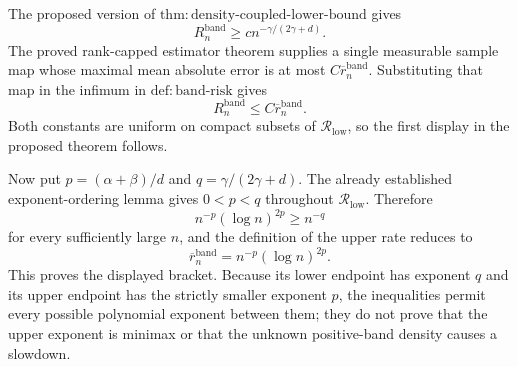 The proposed version of
\(\mathrm{thm:density\mbox{-}coupled\mbox{-}lower\mbox{-}bound}\) gives
\[
R_n^{\mathrm{band}}\geq c n^{-\gamma/(2\gamma+d)}.
\]
The proved rank-capped estimator theorem supplies a single measurable sample
map whose maximal mean absolute error is at most
\(C\overline r_n^{\mathrm{band}}\).  Substituting that map in the infimum in
\(\mathrm{def:band\mbox{-}risk}\) gives
\[
R_n^{\mathrm{band}}\leq C\overline r_n^{\mathrm{band}}.
\]
Both constants are uniform on compact subsets of
\(\mathcal R_{\mathrm{low}}\), so the first display in the proposed theorem
follows.

Now put \(p=(\alpha+\beta)/d\) and
\(q=\gamma/(2\gamma+d)\).  The already established exponent-ordering lemma
gives \(0<p<q\) throughout \(\mathcal R_{\mathrm{low}}\).  Therefore
\[
n^{-p}(\log n)^{2p}\geq n^{-q}
\]
for every sufficiently large \(n\), and the definition of the upper rate
reduces to
\[
\overline r_n^{\mathrm{band}}
=n^{-p}(\log n)^{2p}.
\]
This proves the displayed bracket.  Because its lower endpoint has exponent
\(q\) and its upper endpoint has the strictly smaller exponent \(p\), the
inequalities permit every possible polynomial exponent between them; they do
not prove that the upper exponent is minimax or that the unknown positive-band
density causes a slowdown.